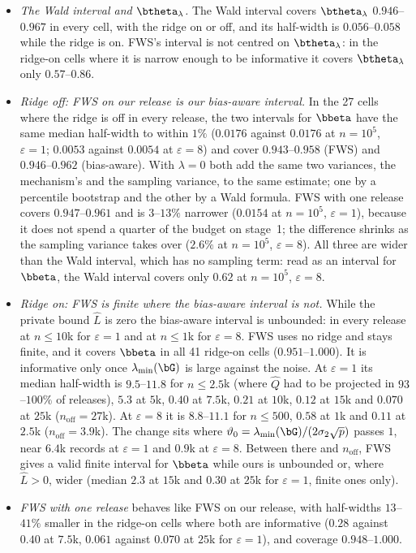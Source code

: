 \begin{itemize}
  \item \emph{The Wald interval and $\btheta_\lambda$.} The Wald interval covers $\btheta_\lambda$ $0.946$--$0.967$ in every cell, with the ridge on or off, and its half-width is $0.056$--$0.058$ while the ridge is on. FWS's interval is not centred on $\btheta_\lambda$: in the ridge-on cells where it is narrow enough to be informative it covers $\btheta_\lambda$ only $0.57$--$0.86$.
  \item \emph{Ridge off: FWS on our release is our bias-aware interval.} In the 27 cells where the ridge is off in every release, the two intervals for $\bbeta$ have the same median half-width to within $1\%$ ($0.0176$ against $0.0176$ at $n = 10^5$, $\varepsilon = 1$; $0.0053$ against $0.0054$ at $\varepsilon = 8$) and cover $0.943$--$0.958$ (FWS) and $0.946$--$0.962$ (bias-aware). With $\lambda = 0$ both add the same two variances, the mechanism's and the sampling variance, to the same estimate; one by a percentile bootstrap and the other by a Wald formula. FWS with one release covers $0.947$--$0.961$ and is $3$--$13\%$ narrower ($0.0154$ at $n = 10^5$, $\varepsilon = 1$), because it does not spend a quarter of the budget on stage~1; the difference shrinks as the sampling variance takes over ($2.6\%$ at $n = 10^5$, $\varepsilon = 8$). All three are wider than the Wald interval, which has no sampling term: read as an interval for $\bbeta$, the Wald interval covers only $0.62$ at $n = 10^5$, $\varepsilon = 8$.
  \item \emph{Ridge on: FWS is finite where the bias-aware interval is not.} While the private bound $\hat L$ is zero the bias-aware interval is unbounded: in every release at $n \le 10$k for $\varepsilon = 1$ and at $n \le 1$k for $\varepsilon = 8$. FWS uses no ridge and stays finite, and it covers $\bbeta$ in all 41 ridge-on cells ($0.951$--$1.000$). It is informative only once $\lambda_{\min}(\bG)$ is large against the noise. At $\varepsilon = 1$ its median half-width is $9.5$--$11.8$ for $n \le 2.5$k (where $\hat Q$ had to be projected in $93$--$100\%$ of releases), $5.3$ at $5$k, $0.40$ at $7.5$k, $0.21$ at $10$k, $0.12$ at $15$k and $0.070$ at $25$k ($n_{\mathrm{off}} = 27$k). At $\varepsilon = 8$ it is $8.8$--$11.1$ for $n \le 500$, $0.58$ at $1$k and $0.11$ at $2.5$k ($n_{\mathrm{off}} = 3.9$k). The change sits where $\vartheta_0 = \lambda_{\min}(\bG)/(2\sigma_2\sqrt p)$ passes $1$, near $6.4$k records at $\varepsilon = 1$ and $0.9$k at $\varepsilon = 8$. Between there and $n_{\mathrm{off}}$, FWS gives a valid finite interval for $\bbeta$ while ours is unbounded or, where $\hat L > 0$, wider (median $2.3$ at $15$k and $0.30$ at $25$k for $\varepsilon = 1$, finite ones only).
  \item \emph{FWS with one release} behaves like FWS on our release, with half-widths $13$--$41\%$ smaller in the ridge-on cells where both are informative ($0.28$ against $0.40$ at $7.5$k, $0.061$ against $0.070$ at $25$k for $\varepsilon = 1$), and coverage $0.948$--$1.000$.
\end{itemize}

